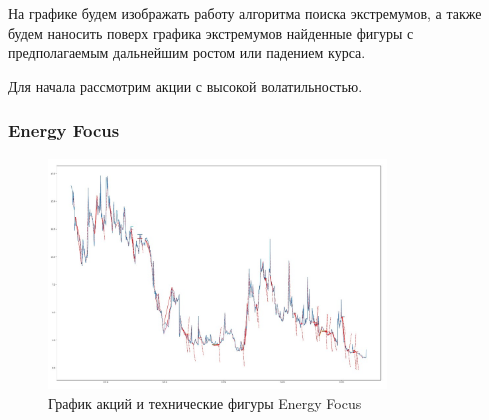 \documentclass[bachelor, och, coursework]{SCWorks}
\begin{document}
    На графике будем изображать работу алгоритма поиска экстремумов, а также
    будем наносить поверх графика экстремумов найденные фигуры с предполагаемым 
    дальнейшим ростом или падением курса.
    
    Для начала рассмотрим акции с высокой волатильностью.
    
    \subsubsection{Energy Focus}
    
    \begin{figure}[H]
        \centering
        \includegraphics[width=0.8\textwidth]{pic/EFOI.jpg}
        \caption{График акций и технические фигуры Energy Focus}
    \end{figure}
   
\end{document}
